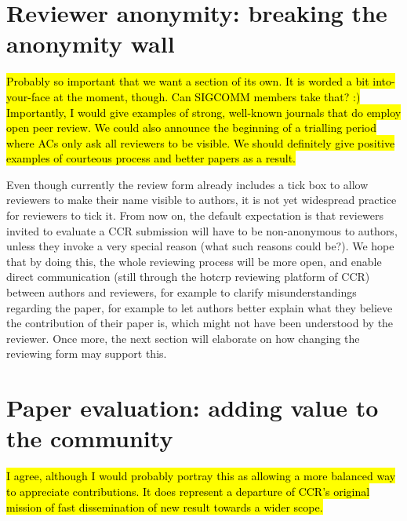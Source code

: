 \documentclass[letterpaper]{article}
\begin{document}
\begin{multicols}{2}
\section{Reviewer anonymity: breaking the anonymity wall}

\hl{Probably so important that we want a section of its own. It is worded a bit into-your-face at the moment, though. Can SIGCOMM members take that? :) Importantly, I would give examples of strong, well-known journals that do employ open peer review. We could also announce the beginning of a trialling period where ACs only ask all reviewers to be visible. We should definitely give positive examples of courteous process and better papers as a result.}

Even though currently the review form already includes a tick box to allow
reviewers to make their name visible to authors, it is not yet widespread
practice for reviewers to tick it. From now on, the default expectation is
that reviewers invited to evaluate a CCR submission will have to be
non-anonymous to authors, unless they invoke a very special reason (what
such reasons could be?). We hope that by doing this, the whole reviewing
process will be more open, and enable direct communication (still through
the hotcrp reviewing platform of CCR) between authors and reviewers, for
example to clarify misunderstandings regarding the paper, for example to
let authors better explain what they believe the contribution of their
paper is, which might not have been understood by the reviewer. Once more,
the next section will elaborate on how changing the reviewing form may
support this.

\section{Paper evaluation: adding value to the community}

\hl{I agree, although I would probably portray this as allowing a more balanced
way to appreciate contributions. It does represent a departure of CCR's
original mission of fast dissemination of new result towards a wider scope.}


\end{multicols}
\end{document}
